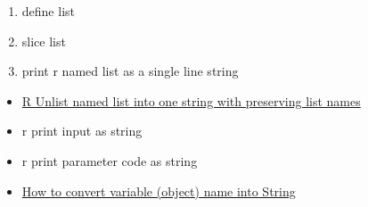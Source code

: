 \documentclass[
]{book}
\newenvironment{Shaded}{\begin{snugshade}}{\end{snugshade}}
\newcommand{\CommentTok}[1]{\textcolor[rgb]{0.56,0.35,0.01}{\textit{#1}}}
\newcommand{\DecValTok}[1]{\textcolor[rgb]{0.00,0.00,0.81}{#1}}
\newcommand{\KeywordTok}[1]{\textcolor[rgb]{0.13,0.29,0.53}{\textbf{#1}}}
\newcommand{\NormalTok}[1]{#1}
\newcommand{\OperatorTok}[1]{\textcolor[rgb]{0.81,0.36,0.00}{\textbf{#1}}}
\newcommand{\StringTok}[1]{\textcolor[rgb]{0.31,0.60,0.02}{#1}}
\providecommand{\tightlist}{%
  \setlength{\itemsep}{0pt}\setlength{\parskip}{0pt}}
\begin{document}
\begin{enumerate}
\def\labelenumi{\arabic{enumi}.}
\tightlist
\item
  define list
\item
  slice list
\item
  print r named list as a single line string
\end{enumerate}

\begin{itemize}
\tightlist
\item
  \href{https://stackoverflow.com/a/55622024/8280804}{R Unlist named list into one string with preserving list names}
\end{itemize}

\begin{Shaded}
\end{Shaded}

\begin{itemize}
\tightlist
\item
  r print input as string
\item
  r print parameter code as string
\item
  \href{https://stackoverflow.com/a/14577878/8280804}{How to convert variable (object) name into String}
\end{itemize}
\end{document}
